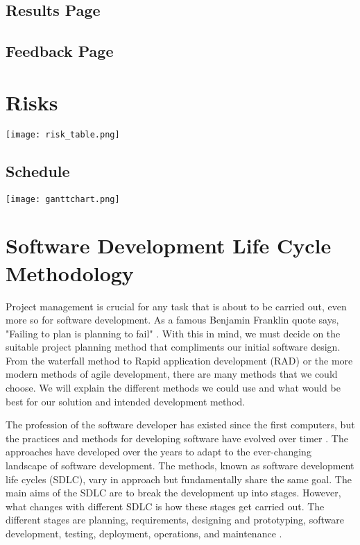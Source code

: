 	\subsection{Results Page}
	
	\subsection{Feedback Page}
	
	
	\section{Risks}
	
	\begin{center}
		\texttt{[image: risk\_table.png]}
	\end{center}
		
	
	
	
	\begin{landscape}
		\section{Schedule}
		\begin{center}
			\item\texttt{[image: ganttchart.png]}
		\end{center}
	\end{landscape}
	
	\section{Software Development Life Cycle Methodology}
	Project management is crucial for any task that is about to be carried out, even more so for software development. As a famous Benjamin Franklin quote says, "Failing to plan is planning to fail" \cite{plan_to_fail}. With this in mind, we must decide on the suitable project planning method that compliments our initial software design. From the waterfall method to Rapid application development (RAD) or the more modern methods of agile development, there are many methods that we could choose. We will explain the different methods we could use and what would be best for our solution and intended development method.
	
	The profession of the software developer has existed since the first computers, but the practices and methods for developing software have evolved over timer \cite{SDLC}. The approaches have developed over the years to adapt to the ever-changing landscape of software development. The methods, known as software development life cycles (SDLC), vary in approach but fundamentally share the same goal. The main aims of the SDLC are to break the development up into stages. However, what changes with different SDLC is how these stages get carried out. The different stages are planning, requirements, designing and prototyping, software development, testing, deployment, operations, and maintenance \cite{SDLC}.
	
